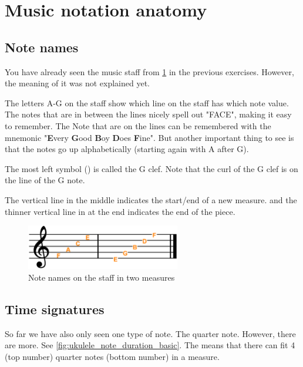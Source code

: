 \section{Music notation anatomy}

\subsection{Note names}

You have already seen the music staff from \ref{fig:ukulele_music_note_names_on_staff} in the previous exercises. However, the meaning of it was not explained yet.

The letters A-G on the staff show which line on the staff has which note value. The notes that are in between the lines nicely spell out "FACE", making it easy to remember. The Note that are on the lines can be remembered with the mnemonic "\textbf{E}very \textbf{G}ood \textbf{B}oy \textbf{D}oes \textbf{F}ine". But another important thing to see is that the notes go up alphabetically (starting again with A after G). 

The most left symbol (\clefG) is called the G clef. Note that the curl of the G clef is on the line of the G note. 

The vertical line in the middle indicates the start/end of a new measure. and the thinner vertical line in at the end indicates the end of the piece.

\begin{figure}[h]
	\centering
	\includegraphics[width=0.6\textwidth]{../../Images/MusicNotation_MeasureNoteNames.png}
	\caption{Note names on the staff in two measures}
	\label{fig:ukulele_music_note_names_on_staff}
\end{figure}

\newpage

\subsection{Time signatures}

So far we have also only seen one type of note. The quarter note. However, there are more. See \ref{fig:ukulele_note_duration_basic}. The  means that there can fit 4 (top number) quarter notes (bottom number) in a measure. 

